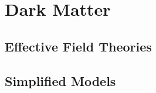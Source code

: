 \label{chapter:theory}

\section{Dark Matter}
\label{sec:theory}


\subsection{Effective Field Theories}

\subsection{Simplified Models}